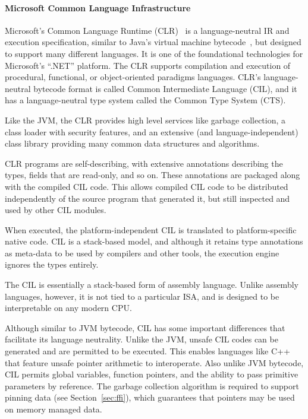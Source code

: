 \paragraph{Microsoft Common Language Infrastructure}

Microsoft's Common Language Runtime (CLR)~\cite{ms06cli,
hamilton03clr} is a language-neutral IR and execution
specification, similar to Java's virtual machine
bytecode~\cite{jvmspec}, but designed to support many different
languages. It is one of the foundational technologies for
Microsoft's ``.NET'' platform. The CLR supports compilation and
execution of procedural, functional, or object-oriented paradigms
languages. CLR's language-neutral bytecode format is called Common
Intermediate Language (CIL), and it has a language-neutral type
system called the Common Type System (CTS).

Like the JVM, the CLR provides high level services like garbage collection, a class loader with security features, and an extensive (and language-independent) class library providing many common data structures and algorithms.

CLR programs are self-describing, with extensive annotations describing the types, fields that are read-only, and so on. These annotations are packaged along with the compiled CIL code. This allows compiled CIL code to be distributed independently of the source program that generated it, but still inspected and used by other CIL modules.

When executed, the platform-independent CIL is translated to platform-specific native code. CIL is a stack-based model, and although it retains type annotations as meta-data to be used by compilers and other tools, the execution engine ignores the types entirely.

The CIL is essentially a stack-based form of assembly language. Unlike assembly languages, however, it is not tied to a particular ISA, and is designed to be interpretable on any modern CPU.

Although similar to JVM bytecode, CIL has some important differences that facilitate its language neutrality. Unlike the JVM, unsafe CIL codes can be generated and are permitted to be executed. This enables languages like C++ that feature unsafe pointer arithmetic to interoperate. Also unlike JVM bytecode, CIL permits global variables, function pointers, and the ability to pass primitive parameters by reference. The garbage collection algorithm is required to support pinning data (see Section~\ref{sec:ffi}), which guarantees that pointers may be used on memory managed data.

